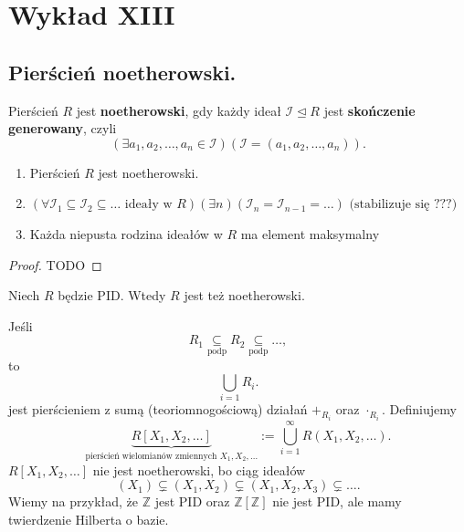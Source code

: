 \chapter{Wykład XIII}

\section{Pierścień noetherowski.}

\begin{definition}
	Pierścień $R$ jest \textbf{noetherowski}, gdy każdy ideał $\mathcal{I}\unlhd R$ jest \textbf{skończenie generowany}, czyli
	\[
	\left(\exists a_1,a_2,\ldots, a_{n} \in \mathcal{I} \right)\left( \mathcal{I} = \left( a_1,a_2,\ldots,a_{n}  \right)  \right)  
	.\] 
\end{definition} 
\begin{theorem}
	\begin{enumerate}[label=\arabic*)]
		\item Pierścień $R$ jest noetherowski.
		\item $\left(\forall \mathcal{I}_{1}\subseteq \mathcal{I}_{2} \subseteq \ldots \text{ ideały w } R \right)\left(\exists n \right)\left( \mathcal{I}_{n} = \mathcal{I}_{n-1} = \ldots  \right) \text{ (stabilizuje się ???)}  $ 
		\item Każda niepusta rodzina ideałów w $R$ ma element maksymalny
	\end{enumerate}
\end{theorem} 
\begin{proof}
	TODO
\end{proof} 
\begin{eg}
	Niech $R$ będzie PID. Wtedy $R$ jest też noetherowski.
\end{eg} 
\begin{remark}
	Jeśli \[
	R_1\underset{\scriptscriptstyle\text{podp}}{\subseteq} R_2\underset{\scriptscriptstyle\text{podp}}{\subseteq} \ldots
	,\] 
	to \[
	\bigcup_{i=1} R_{i}
	.\] 
	jest pierścieniem z sumą (teoriomnogościową) działań $+_{\scriptscriptstyle R_{i}}$ oraz $\cdot _{\scriptscriptstyle R_{i}}$.
	Definiujemy
	\[
	\underbrace{R\left[ X_1,X_2,\ldots \right] }_{\text{pierścień wielomianów zmiennych }X_1, X_2,\ldots}:= \bigcup_{i=1}^{\infty}R\left( X_1, X_2,\ldots \right) 
	.\] 
	$R\left[ X_1,X_2,\ldots \right] $ nie jest noetherowski, bo ciąg ideałów
	\[
		\left( X_1 \right) \varsubsetneq \left( X_1,X_2 \right) \varsubsetneq \left( X_1,X_2,X_3 \right) \varsubsetneq \ldots
	.\] 
	Wiemy na przykład, że $\mathbb{Z} $ jest PID oraz $\mathbb{Z} \left[ \mathbb{Z}  \right] $ nie jest PID, ale mamy twierdzenie Hilberta o bazie.
\end{remark} 

